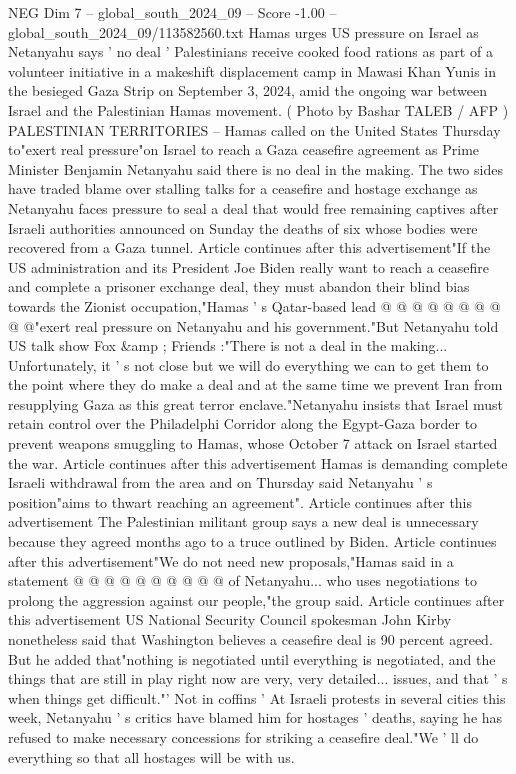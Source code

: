 \begin{textsample}{NEG Dim 7 – global\_south\_2024\_09 – Score -1.00 – global\_south\_2024\_09/113582560.txt}  \label{ex:f7_neg_227}
Hamas urges US pressure on Israel as Netanyahu says ' no deal ' Palestinians receive cooked food rations as part of a volunteer initiative in a makeshift displacement camp in Mawasi Khan Yunis in the besieged Gaza Strip on September 3, 2024, amid the ongoing war between Israel and the Palestinian Hamas movement. ( Photo by Bashar TALEB / AFP ) PALESTINIAN TERRITORIES -- Hamas called on the United States Thursday to"exert real pressure"on Israel to reach a Gaza ceasefire agreement as Prime Minister Benjamin Netanyahu said there is no deal in the making.
The two sides have traded blame over stalling talks for a ceasefire and hostage exchange as Netanyahu faces pressure to seal a deal that would free remaining captives after Israeli authorities announced on Sunday the deaths of six whose bodies were recovered from a Gaza tunnel.
Article continues after this advertisement"If the US administration and its President Joe Biden really want to reach a ceasefire and complete a prisoner exchange deal, they must abandon their blind bias towards the Zionist occupation,"Hamas ' s Qatar-based lead @ @ @ @ @ @ @ @ @ @"exert real pressure on Netanyahu and his government."But Netanyahu told US talk show Fox \&amp ; Friends :"There is not a deal in the making...
Unfortunately, it ' s not close but we will do everything we can to get them to the point where they do make a deal and at the same time we prevent Iran from resupplying Gaza as this great terror enclave."Netanyahu insists that Israel must retain control over the Philadelphi Corridor along the Egypt-Gaza border to prevent weapons smuggling to Hamas, whose October 7 attack on Israel started the war.
Article continues after this advertisement Hamas is demanding complete Israeli withdrawal from the area and on Thursday said Netanyahu ' s position"aims to thwart reaching an agreement".
Article continues after this advertisement The Palestinian militant group says a new deal is unnecessary because they agreed months ago to a truce outlined by Biden.
Article continues after this advertisement"We do not need new proposals,"Hamas said in a statement @ @ @ @ @ @ @ @ @ @ of Netanyahu... who uses negotiations to prolong the aggression against our people,"the group said.
Article continues after this advertisement US National Security Council spokesman John Kirby nonetheless said that Washington believes a ceasefire deal is 90 percent agreed.
But he added that"nothing is negotiated until everything is negotiated, and the things that are still in play right now are very, very detailed... issues, and that ' s when things get difficult."' Not in coffins ' At Israeli protests in several cities this week, Netanyahu ' s critics have blamed him for hostages ' deaths, saying he has refused to make necessary concessions for striking a ceasefire deal."We ' ll do everything so that all hostages will be with us.

\end{textsample}
